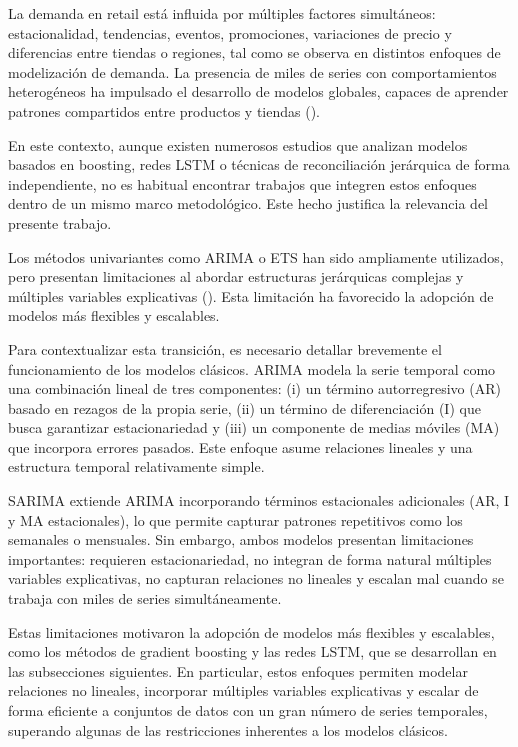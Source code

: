\documentclass[IB,BIB]{TFUOC}%
\begin{document}
La demanda en retail está influida por múltiples factores simultáneos:
estacionalidad, tendencias, eventos, promociones, variaciones de precio
y diferencias entre tiendas o regiones, tal como se observa en distintos
enfoques de modelización de demanda. La presencia de miles de
series con comportamientos heterogéneos ha impulsado el desarrollo de
modelos globales, capaces de aprender patrones compartidos entre
productos y tiendas (\cite{salinas2017}).

En este contexto, aunque existen numerosos estudios que analizan
modelos basados en boosting, redes LSTM o técnicas de reconciliación
jerárquica de forma independiente, no es habitual encontrar trabajos que
integren estos enfoques dentro de un mismo marco metodológico. Este hecho
justifica la relevancia del presente trabajo.

Los métodos univariantes como ARIMA o ETS han sido ampliamente
utilizados, pero presentan limitaciones al abordar estructuras
jerárquicas complejas y múltiples variables explicativas (\cite{hyndman2021}). Esta
limitación ha favorecido la adopción de modelos más flexibles y
escalables.

Para contextualizar esta transición, es necesario
detallar brevemente el funcionamiento de los modelos clásicos. ARIMA
modela la serie temporal como una combinación lineal de tres
componentes: (i) un término autorregresivo (AR) basado en rezagos de la
propia serie, (ii) un término de diferenciación (I) que busca garantizar
estacionariedad y (iii) un componente de medias móviles (MA) que
incorpora errores pasados. Este enfoque asume relaciones lineales y una
estructura temporal relativamente simple.

SARIMA extiende ARIMA incorporando términos
estacionales adicionales (AR, I y MA estacionales), lo que permite
capturar patrones repetitivos como los semanales o mensuales. Sin
embargo, ambos modelos presentan limitaciones importantes: requieren
estacionariedad, no integran de forma natural múltiples variables
explicativas, no capturan relaciones no lineales y escalan mal cuando se
trabaja con miles de series simultáneamente.

Estas limitaciones motivaron la adopción de modelos
más flexibles y escalables, como los métodos de gradient boosting y las
redes LSTM, que se desarrollan en las subsecciones siguientes. En
particular, estos enfoques permiten modelar relaciones no lineales,
incorporar múltiples variables explicativas y escalar de forma eficiente
a conjuntos de datos con un gran número de series temporales, superando
algunas de las restricciones inherentes a los modelos clásicos.
\end{document}
